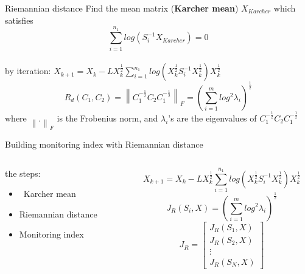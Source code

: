 \documentclass[10pt]{beamer}
\newcommand{\norm}[1]{\left\lVert#1\right\rVert}
\begin{document}
\begin{frame}{Riemannian distance}
Find the mean matrix (\textbf{Karcher mean}) $X_{Karcher}$ which satisfies
    \begin{equation}\sum\limits^{n_1}_{i=1}log(S_i^{-1}X_{Karcher})=0\end{equation}\\
    by iteration:   \href{https://www.sciencedirect.com/science/article/pii/S0024379511006616}{$
        X_{k+1}=X_k-L X_k^{\frac{1}{2}}\sum\limits^{n_1}_{i=1}log(X_k^{\frac{1}{2}}S_i^{-1}X_k^{\frac{1}{2}})X_k^{\frac{1}{2}}
        \label{eq:iteration2} $ } 
    \begin{equation}
R_d(C_1,C_2) = \norm{ C_1^{-\frac{1}{2}}C_2C_1^{-\frac{1}{2}}}_F = \left(  \sum_{i=1}^mlog^2\lambda_i  \right)^\frac{1}{2}
    \end{equation} 
    where $\norm{.}_F$ is the Frobenius norm, and $\lambda_i$'s are the eigenvalues  of $ C_1^{-\frac{1}{2}}C_2C_1^{-\frac{1}{2}}$
\end{frame}
\begin{frame}{Building monitoring index with Riemannian distance}
   \begin{columns}
        \begin{column}{0.5\textwidth}
            the steps:
      \begin{itemize}
      \item \  Karcher mean
      \item   Riemannian distance
      \item    Monitoring index
 	 \end{itemize}  
        \end{column}
        \begin{column}{0.6\textwidth}  %
               \begin{equation}
                 X_{k+1}=X_k-L X_k^{\frac{1}{2}}\sum\limits^{n_1}_{i=1}log(X_k^{\frac{1}{2}}S_i^{-1}X_k^{\frac{1}{2}})X_k^{\frac{1}{2}}
               \end{equation}
                \begin{equation}
                  J_R(S_i,X) =  \left(  \sum_{i=1}^mlog^2\lambda_i  \right)^\frac{1}{2}
                \end{equation}
                 \begin{equation}
                  J_R =  \begin{bmatrix}
                          J_R(S_1,X) \\
                          J_R(S_2,X) \\
                          \vdots     \\
                           J_R(S_N,X)
                         \end{bmatrix}
                         \label{Jr}
                \end{equation}
        \end{column}
    \end{columns}
\end{frame}
\end{document}
